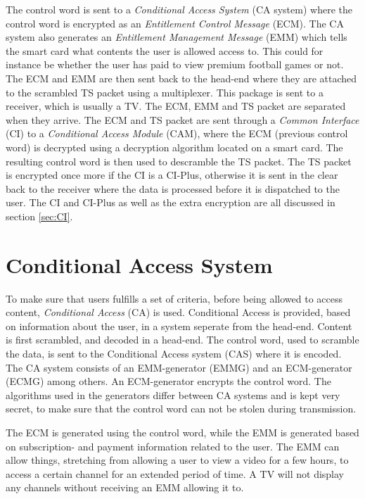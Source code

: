 The control word is sent to a \emph{Conditional Access System} 
(CA system) where the control word is encrypted as an 
\emph{Entitlement Control Message} (ECM). The CA system also generates 
an \emph{Entitlement Management Message} (EMM) which tells the 
smart card what contents the user is allowed access to. This could for 
instance be whether the user has paid to view premium football games or 
not. The ECM and EMM are then sent back to the head-end where they are 
attached to the scrambled TS packet using a multiplexer. This package 
is sent to a receiver, which is usually a TV. The ECM, EMM and TS 
packet are separated when they arrive. The ECM and TS packet are sent 
through a \emph{Common Interface} (CI) to a \emph{Conditional Access 
Module} (CAM), where the ECM (previous control word) is decrypted using 
a decryption algorithm located on a smart card. The resulting control 
word is then used to descramble the TS packet. The TS packet is 
encrypted once more if the CI is a CI-Plus, otherwise it is sent in the 
clear back to the receiver where the data is processed before it is 
dispatched to the user. The CI and CI-Plus as well as the extra 
encryption are all discussed in section \ref{sec:CI}.

\section{Conditional Access System} \label{sec:CAS}
To make sure that users fulfills a set of criteria, before being 
allowed to access content, \emph{Conditional Access} (CA) is used. 
Conditional Access is provided, based on information about the user, 
in a system seperate from the head-end. Content is first scrambled, and 
decoded in a head-end. The control word, used to scramble the data, is 
sent to the Conditional Access system (CAS) where it is encoded. The CA 
system consists of an EMM-generator (EMMG) and an ECM-generator (ECMG) 
among others. An ECM-generator encrypts the control word. The 
algorithms used in the generators differ between CA systems and is kept 
very secret, to make sure that the control word can not be stolen 
during transmission.

The ECM is generated using the control word, while the EMM is generated 
based on subscription- and payment information related to the user. The 
EMM can allow things, stretching from allowing a user to view a video 
for a few hours, to access a certain channel for an extended period of 
time. A TV will not display any channels without receiving an EMM 
allowing it to.

